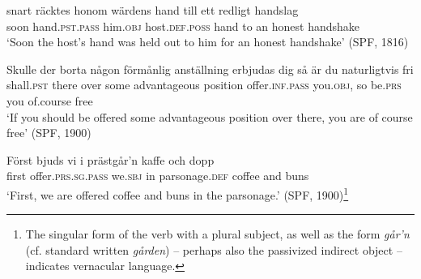 \documentclass[output=paper]{langscibook}
\begin{document}
\ex\label{ex:falk:20d}
\gll snart  räcktes        honom    wärdens        hand  till   ett  redligt  handslag\\
      soon  hand\textsc{.pst.pass}  him\textsc{.obj}  host.\textsc{def.poss}   hand  to   an  honest   handshake\\
\glt ‘Soon the host’s hand was held out to him for an honest handshake’ (SPF, 1816)

\ex\label{ex:falk:20e}
\gll Skulle      der  borta  någon  förmånlig    anställning  erbjudas dig         så   är      du    naturligtvis    fri\\
shall.\textsc{pst}     there  over  some    advantageous  position     offer\textsc{.inf}.\textsc{pass}      you\textsc{.obj},   so  be.\textsc{prs}  you  of.course      free\\
\glt ‘If you should be offered some advantageous position over there, you are of         course free’ (SPF, 1900)

\ex\label{ex:falk:20f}
\gll Först  bjuds            vi      i  prästgår’n      kaffe    och  dopp\\
      first  offer\textsc{.prs}.\textsc{sg.pass}    we.\textsc{sbj}  in  parsonage\textsc{.def}  coffee  and  buns\\
\glt ‘First, we are offered coffee and buns in the parsonage.’ (SPF, 1900)\footnote{The singular form of the verb with a plural subject, as well as the form \textit{går’n} (cf. standard written \textit{gården}) – perhaps also the passivized indirect object – indicates vernacular language.}
\z
\z
\end{document}
